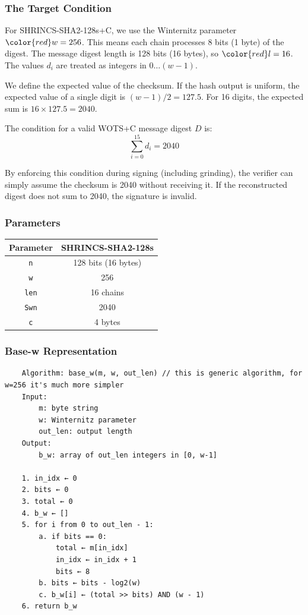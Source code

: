 \subsubsection{The Target Condition}
For SHRINCS-SHA2-128s+C, we use the Winternitz parameter $\color{red}w=256$. This means each chain processes 8 bits (1 byte) of the digest. The message digest length is 128 bits (16 bytes), so $\color{red}l = 16$. The values $d_i$ are treated as integers in $0\dots (w-1)$.

We define the expected value of the checksum. If the hash output is uniform, the expected value of a single digit is $(w-1)/2 = 127.5$. For 16 digits, the expected sum is $16 \times 127.5 = 2040$.

The condition for a valid WOTS+C message digest $D$ is: $$\sum_{i=0}^{15}d_i = 2040$$

By enforcing this condition during signing (including grinding), the verifier can simply assume the checksum is 2040 without receiving it. If the reconstructed digest does not sum to 2040, the signature is invalid. 

\subsubsection{Parameters}

\begin{center}
\begin{tabular}{ c c }
 Parameter & SHRINCS-SHA2-128s \\ 
 \hline
 \texttt{n} & 128 bits (16 bytes) \\
 \texttt{w} & \color{red} 256 \\
 \texttt{len} & \color{red} 16 chains \\
 \texttt{Swn} & \color{red} 2040 \\
 \texttt{c} & \color{red} 4 bytes
\end{tabular}
\end{center}

\subsubsection{Base-w Representation}
\begin{verbatim}
    Algorithm: base_w(m, w, out_len) // this is generic algorithm, for w=256 it's much more simpler
    Input: 
        m: byte string
        w: Winternitz parameter
        out_len: output length
    Output: 
        b_w: array of out_len integers in [0, w-1]
    
    1. in_idx ← 0
    2. bits ← 0
    3. total ← 0
    4. b_w ← []
    5. for i from 0 to out_len - 1:
        a. if bits == 0:
            total ← m[in_idx]
            in_idx ← in_idx + 1
            bits ← 8
        b. bits ← bits - log2(w)
        c. b_w[i] ← (total >> bits) AND (w - 1)
    6. return b_w
\end{verbatim} 

